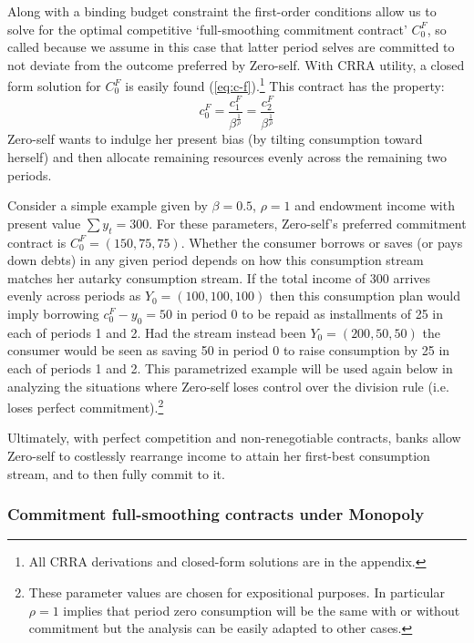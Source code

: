 \documentclass[11pt,english]{article}
\theoremstyle{plain}
\theoremstyle{definition}
\begin{document}
Along with a binding budget constraint the first-order conditions
allow us to solve for the optimal competitive `full-smoothing commitment
contract' $C_{0}^{F}$, so called because we assume in this case that
latter period selves are committed to not deviate from the outcome
preferred by Zero-self. With CRRA utility, a closed form solution
for $C_{0}^{F}$ is easily found (\ref{eq:c-f}).\footnote{All CRRA derivations and closed-form solutions are in the appendix.}
This contract has the property: 
\begin{equation}
c_{0}^{F}=\frac{c_{1}^{F}}{\beta^{\frac{1}{\rho}}}=\frac{c_{2}^{F}}{\beta^{\frac{1}{\rho}}}
\end{equation}
Zero-self wants to indulge her present bias (by tilting consumption
toward herself) and then allocate remaining resources evenly across
the remaining two periods. 

Consider a simple example given by $\beta=0.5$, $\rho=1$ and endowment
income with present value $\sum y_{t}=300$. For these parameters,
Zero-self's preferred commitment contract is $C_{0}^{F}=(150,75,75)$.
Whether the consumer borrows or saves (or pays down debts) in any
given period depends on how this consumption stream matches her autarky
consumption stream. If the total income of $300$ arrives evenly across
periods as $Y_{0}=(100,100,100)$ then this consumption plan would
imply borrowing $c_{0}^{F}-y_{0}=50$ in period 0 to be repaid as
installments of 25 in each of periods 1 and 2. Had the stream instead
been $Y_{0}=(200,50,50)$ the consumer would be seen as saving 50
in period 0 to raise consumption by 25 in each of periods 1 and 2.
This parametrized example will be used again below in analyzing the
situations where Zero-self loses control over the division rule (i.e.
loses perfect commitment).\footnote{These parameter values are chosen for expositional purposes. In particular
$\rho=1$ implies that period zero consumption will be the same with
or without commitment but the analysis can be easily adapted to other
cases.}

Ultimately, with perfect competition and non-renegotiable contracts,
banks allow Zero-self to costlessly rearrange income to attain her
first-best consumption stream, and to then fully commit to it.

\subsubsection{Commitment full-smoothing contracts under Monopoly}
\end{document}
